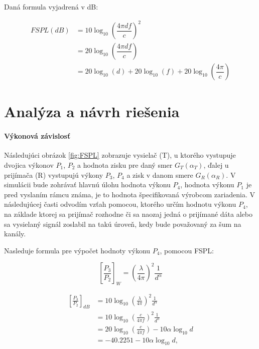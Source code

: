 \documentclass[11pt,twoside,a4paper]{book}
\begin{document}
Daná formula vyjadrená v dB:

\begin{align*}
FSPL(dB) &= 10 \log_{10}\left(\dfrac{4 \pi df}{c} \right)^{2} \\
&= 20 \log_{10}\left(\dfrac{4 \pi df }{c} \right) \\
&= 20 \log_{10}(d) + 20 \log_{10}(f) + 20 \log_{10} \left(\dfrac{4 \pi}{c}\right)
\end{align*}




\chapter{Analýza a návrh riešenia}


\subsubsection{Výkonová závislosť}

Následujúci obrázok \ref{fig:FSPL} zobrazuje vysielač (T), u ktorého vystupuje dvojica výkonov $P_{1}$, $P_{2}$ a hodnota zisku pre daný smer $G_{T}(\alpha_{T})$, ďalej u prijímača (R) vystupujú výkony $P_{3}$, $P_{4}$ a zisk v danom smere $G_{R}(\alpha_{R})$. V simulácii bude zohrávať hlavnú úlohu hodnota výkonu $P_{4}$, hodnota výkonu $P_{1}$ je pred vyslaním rámcu známa, je to hodnota špecifikovaná výrobcom zariadenia. V následujúcej časti odvodím vzťah pomocou, ktorého určím hodnotu výkonu $P_{4}$, na základe ktorej sa prijímač rozhodne či sa naozaj jedná o prijímané dáta alebo sa vysielaný signál zoslabil na takú úroveň, kedy bude považovaný za šum na kanály.

Nasleduje formula pre výpočet hodnoty výkonu $P_{4}$, pomocou FSPL:

\[
\left[\frac{P_{3}}{P_{2}}\right]_{W} =\left(\frac{\lambda}{4\pi}\right)^{2}\frac{1}{d^{\alpha}}
\]

\begin{align*}
\left[\frac{P_{3}}{P_{2}}\right]_{dB} &= 10\log_{10}\left(\frac{\lambda}{4\pi}\right)^{2}\frac{1}{d^{\alpha}} \\
&= 10\log_{10}\left(\frac{c}{4\pi f}\right)^{2}\frac{1}{d^{\alpha}} \\
&= 20\log_{10}\left(\frac{c}{4\pi f}\right)-10\alpha\log_{10}d \\
&= -40.2251-10\alpha\log_{10}d, 
\end{align*}
\end{document}
